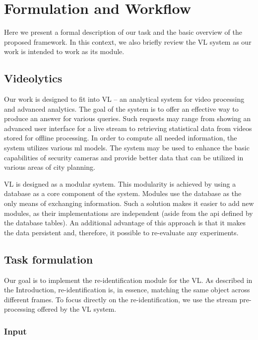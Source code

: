 \chapter{Formulation and Workflow}

Here we present a formal description of our task and the basic overview of the proposed framework. In this context, we also briefly review the \gls{VL} system as our work is intended to work as its module.

\section{Videolytics}

\label{sec:vl}

Our work is designed to fit into \gls{VL}  -- an analytical system for video processing and advanced analytics. The goal of the system is to offer an effective way to produce an answer for various queries. Such requests may range from showing an advanced user interface for a live stream to retrieving statistical data from videos stored for offline processing. In order to compute all needed information, the system utilizes various \gls{ml} models. The system may be used to enhance the basic capabilities of security cameras and provide better data that can be utilized in various areas of city planning.

\Gls{VL} is designed as a modular system. This modularity is achieved by using a database as a core component of the system. Modules use the database as the only means of exchanging information. Such a solution makes it easier to add new modules, as their implementations are independent (aside from the \gls{api} defined by the database tables). An additional advantage of this approach is that it makes the data persistent and, therefore, it possible to re-evaluate any experiments.

\section{Task formulation}

Our goal is to implement the re-identification module for the \gls{VL}. As described in the Introduction, re-identification is, in essence, matching the same object across different frames. To focus directly on the re-identification, we use the stream pre-processing offered by the \gls{VL} system.

\subsection{Input}

